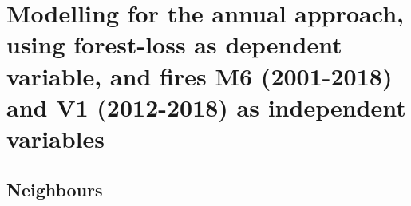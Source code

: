 \documentclass[10pt,landscape,a3paper]{article}
\begin{document}
\hypertarget{modelling-for-the-annual-approach-using-forest-loss-as-dependent-variable-and-fires-m6-2001-2018-and-v1-2012-2018-as-independent-variables}{%
\section{\texorpdfstring{Modelling for the \textbf{annual approach},
using forest-loss as dependent variable, and fires M6 (2001-2018) and V1
(2012-2018) as independent
variables}{Modelling for the annual approach, using forest-loss as dependent variable, and fires M6 (2001-2018) and V1 (2012-2018) as independent variables}}\label{modelling-for-the-annual-approach-using-forest-loss-as-dependent-variable-and-fires-m6-2001-2018-and-v1-2012-2018-as-independent-variables}}

\hypertarget{neighbours}{%
\subsection{Neighbours}\label{neighbours}}
\end{document}
